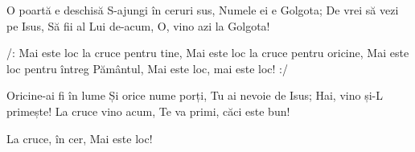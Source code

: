 \beginverse
O poartă e deschisă
S-ajungi în ceruri sus,
Numele ei e Golgota;
De vrei să vezi pe Isus,
Să fii al Lui de-acum,
O, vino azi la Golgota!
\endverse

\beginchorus
/: Mai este loc la cruce pentru tine,
Mai este loc la cruce pentru oricine,
Mai este loc pentru întreg Pământul,
Mai este loc, mai este loc! :/
\endchorus

\beginverse
Oricine-ai fi în lume
Și orice nume porți,
Tu ai nevoie de Isus;
Hai, vino și-L primește!
La cruce vino acum,
Te va primi, căci este bun!
\endverse

\beginverse*
La cruce, în cer,
Mai este loc!
\endverse
\endsong
